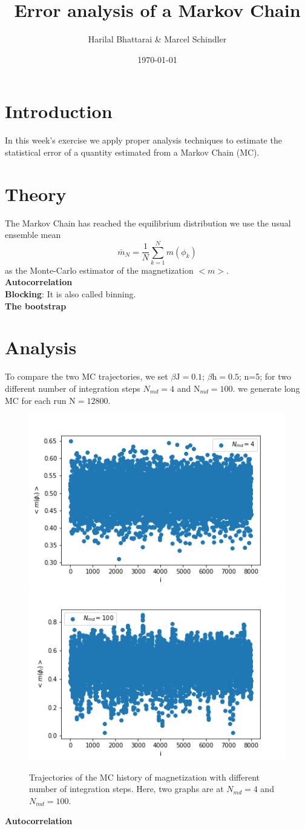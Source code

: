 \documentclass[11pt, a4paper, DIV=12]{scrartcl}
\title{Error analysis of a Markov Chain}
\date{\today}
\author{Harilal Bhattarai \& Marcel Schindler}
\begin{document}
	\maketitle
	
\section{Introduction}
In this week’s exercise we apply proper analysis techniques to estimate the statistical error of a quantity estimated from a Markov Chain (MC).
\section{Theory}
The Markov Chain has reached the equilibrium distribution we use the usual ensemble mean
\begin{equation}
\bar{m}_{N}= \frac{1}{N}\sum_{k=1}^{N} m(\phi_{k})
\end{equation}
as the Monte-Carlo estimator of the magnetization $ <m> $.\\

\textbf{Autocorrelation}\\
\textbf{Blocking}: It is also called binning.\\
\textbf{The bootstrap}

\section{Analysis}
To compare the two MC trajectories, we set $\beta \text{J}= 0.1 $; $\beta \text{h}= 0.5 $; n=5; for two different number of integration steps $ N_{md}=4$ and  $\text{N}_{md}= 100 $. we generate long MC for each run $ \text{N}=12800 $.

\begin{figure}[H]
	\centering
	\includegraphics[width=0.6\linewidth]{comparison_magnitization_4.png}\includegraphics[width=0.6\linewidth]{comparison_magnitization_100.png}
	\caption{Trajectories of the MC history of magnetization with different number of integration steps. Here, two graphs are at $ N_{md}=4$ and $ N_{md}=100$.}
	\label{fig:comperison}
\end{figure}
\textbf{Autocorrelation}
\end{document}
